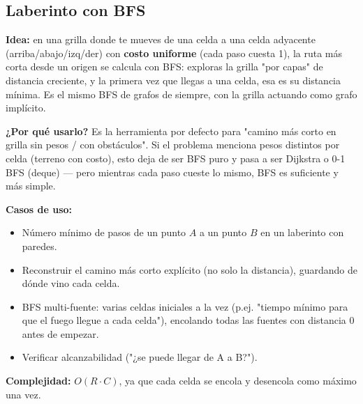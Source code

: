 \documentclass[10pt,a4paper,twocolumn]{article}
\begin{document}
\subsection{Laberinto con BFS}

\textbf{Idea:} en una grilla donde te mueves de una celda a una
celda adyacente (arriba/abajo/izq/der) con \textbf{costo uniforme}
(cada paso cuesta 1), la ruta más corta desde un origen se calcula
con BFS: exploras la grilla "por capas" de distancia creciente, y la
primera vez que llegas a una celda, esa es su distancia mínima. Es el
mismo BFS de grafos de siempre, con la grilla actuando como grafo
implícito.

\textbf{¿Por qué usarlo?} Es la herramienta por defecto para
"camino más corto en grilla sin pesos / con obstáculos". Si el
problema menciona pesos distintos por celda (terreno con costo), esto
deja de ser BFS puro y pasa a ser Dijkstra o 0-1 BFS (deque) — pero
mientras cada paso cueste lo mismo, BFS es suficiente y más simple.

\textbf{Casos de uso:}

\begin{itemize}
	\item Número mínimo de pasos de un punto $A$ a un punto $B$ en
	un laberinto con paredes.
	\item Reconstruir el camino más corto explícito (no solo la
	distancia), guardando de dónde vino cada celda.
	\item BFS multi-fuente: varias celdas iniciales a la vez (p.ej.
	"tiempo mínimo para que el fuego llegue a cada celda"),
	encolando todas las fuentes con distancia 0 antes de empezar.
	\item Verificar alcanzabilidad ("¿se puede llegar de A a B?").
\end{itemize}

\textbf{Complejidad:} $O(R \cdot C)$, ya que cada celda se encola y
desencola como máximo una vez.
\end{document}
